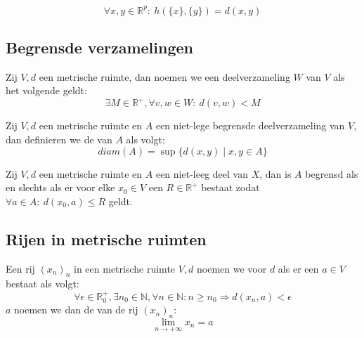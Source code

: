 \documentclass[main.tex]{subfiles}
\begin{document}
\begin{st}
  \[ \forall x,y \in \mathbb{R}^{p}:\ h(\{x\},\{y\}) = d(x,y) \]
\end{st}


\subsection{Begrensde verzamelingen}
\label{sec:begr-verz}

\begin{de}
  Zij $V,d$ een metrische ruimte, dan noemen we een deelverzameling $W$ van $V$  als het volgende geldt:
  \[ \exists M\in \mathbb{R}^{+}, \forall v,w\in W:\ d(v,w) < M \]
\end{de}

\begin{de}
  Zij $V,d$ een metrische ruimte en $A$ een niet-lege begrensde deelverzameling van $V$, dan definieren we de  van $A$ als volgt:
  \[ diam(A) = \sup\{d(x,y) \mid x,y \in A \} \]
\end{de}

\begin{bpr}
  Zij $V,d$ een metrische ruimte en $A$ een niet-leeg deel van $X$, dan is $A$ begrensd als en slechts als er voor elke $x_{0}\in V$ een $R\in \mathbb{R}^{+}$ bestaat zodat $\forall a\in A:\ d(x_{0},a) \le R$ geldt.
\end{bpr}

\subsection{Rijen in metrische ruimten}
\label{sec:rijen-metr-ruimt}

\begin{de}
  Een rij $(x_{n})_{n}$ in een metrische ruimte $V,d$ noemen we  voor $d$ als er een $a\in V$ bestaat als volgt:
  \[ \forall \epsilon\in\mathbb{R}_{0}^{+}, \exists n_{0}\in \mathbb{N}, \forall n\in \mathbb{N}: n \ge n_{0} \Rightarrow d(x_{n},a) < \epsilon \]
  $a$ noemen we dan de  van de rij $(x_{n})_{n}$:
  \[ \lim_{n\rightarrow +\infty}x_{n} = a \]
\end{de}
\end{document}

